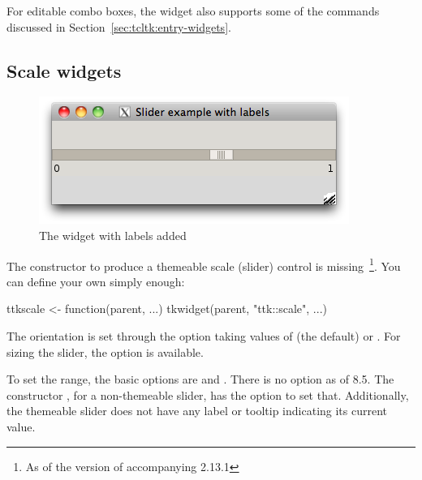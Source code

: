 For editable combo boxes, the widget also supports some of the
 commands discussed in
Section~\ref{sec:tcltk:entry-widgets}.






\subsection{Scale widgets}
\label{sec:tcltk:scale-widgets}


\begin{figure}
  \centering
  \includegraphics[width=.5\textwidth]{fig-tcltk-slider-labels.png}
  \caption{The  widget with labels added}
  \label{fig:tcltk-slider-labels}
\end{figure}

The  constructor to produce a themeable scale
(slider) control is missing~\footnote{As of the version of 
  accompanying \R{} 2.13.1}. You can define your own simply enough:
\begin{Schunk}
\begin{Sinput}
 ttkscale <- function(parent, ...) 
   tkwidget(parent, "ttk::scale", ...)
\end{Sinput}
\end{Schunk}

The orientation is set through the option 
taking values of  (the default) or
. For sizing the slider, the 
option is available.  

To set the range, the basic options are  and
. There is no  option as of \TK\/
8.5. The constructor , for a non-themeable slider,
has the option  to set that. Additionally,
the themeable slider does not have any label or tooltip indicating its
current value.


